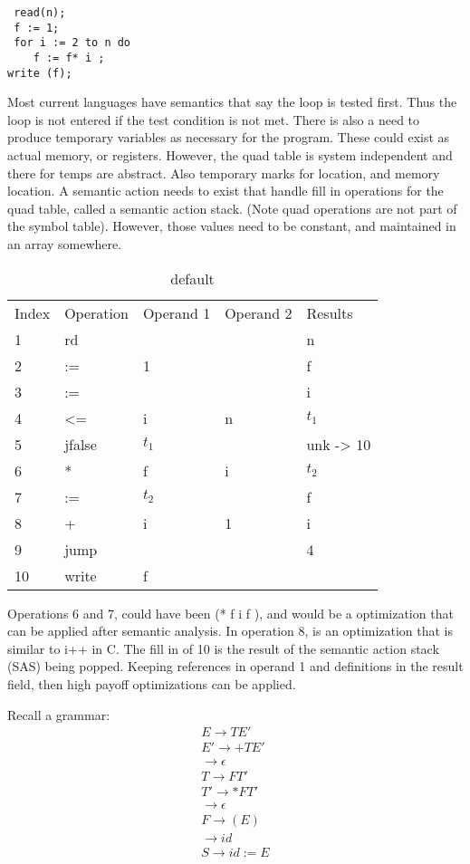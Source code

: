 \begin{lstlisting}
 read(n);
 f := 1;
 for i := 2 to n do 
 	f := f* i ;
write (f);
\end{lstlisting}
Most current languages have semantics that say the loop is tested first.  Thus the loop is not entered if the test condition is not met.  There is also a need to produce temporary variables as necessary for the program.  These could exist as actual memory, or registers.  However, the quad table is system independent and there for temps are abstract.  Also temporary marks for location, and memory location.  A semantic action needs to exist that handle fill in operations for the quad table, called a semantic action stack.   (Note quad operations are not part of the symbol table).  However, those values need to be constant, and maintained in an array somewhere.  


\begin{table}[htdp]
\caption{default}
\begin{center}
\begin{tabular}{|l|l|l|l|l| }
Index & 	Operation	& Operand 1	& Operand 2	& Results \\
1	&	rd		&	&	& n	\\
2	& 	:=		& 1	&	& f 	\\
3	& 	:=		&	&	& i	\\
4	&	<= 		& i 	& n	& $t_1$	\\
5	&	jfalse	& $t_1$	&	&	unk -> 10	\\
6	&	*		&	f	& i	&	$t_2$ \\
7	&	:= 		& $t_2$	& 	&	f	\\
8	& 	+		& i 		& 1	& i	\\
9	&	jump		&		&	& 4 \\
10 	&	write		& f		&	&	
\end{tabular}
\end{center}
\label{default}
\end{table}%
Operations 6 and 7, could have been (* f i f ), and would be a optimization that can be applied after semantic analysis.   In operation 8, is an optimization that is similar to i++ in C.    The fill in of 10 is the result of the semantic action stack (SAS) being popped.    Keeping references in operand 1 and definitions in the result field, then high payoff optimizations can be applied.  

Recall a grammar:
\begin{eqnarray*}
E \to TE' \\
E' \to + TE' \\
\to \epsilon \\
T \to F T'  \\
T' \to * FT' \\
\to \epsilon \\
F \to (E) \\
\to id   \\
S \to id := E
\end{eqnarray*}


